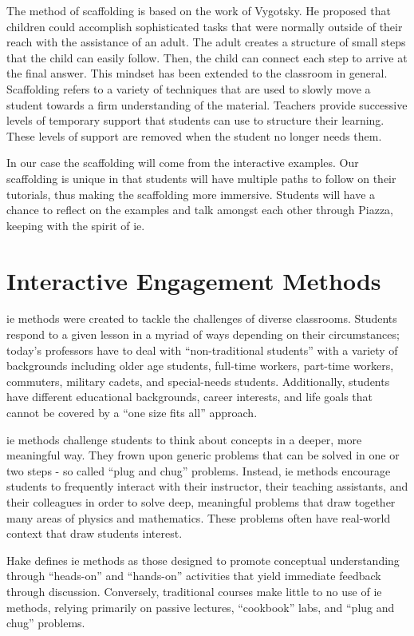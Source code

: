 The method of scaffolding is based on the work of Vygotsky. He proposed that children could accomplish sophisticated tasks that were normally outside of their reach with the assistance of an adult. The adult creates a structure of small steps that the child can easily follow. Then, the child can connect each step to arrive at the final answer. This mindset has been extended to the classroom in general. Scaffolding refers to a variety of techniques that are used to slowly move a student towards a firm understanding of the material. Teachers provide successive levels of temporary support that students can use to structure their learning. These levels of support are removed when the student no longer needs them.

In our case the scaffolding will come from the interactive examples. Our scaffolding is unique in that students will have multiple paths to follow on their tutorials, thus making the scaffolding more immersive. Students will have a chance to reflect on the examples and talk amongst each other through Piazza, keeping with the spirit of \gls{ie}.

\section{Interactive Engagement Methods}

\gls{ie} methods were created to tackle the challenges of diverse classrooms. Students respond to a given lesson in a myriad of ways depending on their circumstances; today's professors have to deal with ``non-traditional students'' with a variety of backgrounds including older age students, full-time workers, part-time workers, commuters, military cadets, and special-needs students. Additionally, students have different educational backgrounds, career interests, and life goals that cannot be covered by a ``one size fits all'' approach\cite{novak1999}.

\gls{ie} methods challenge students to think about concepts in a deeper, more meaningful way. They frown upon generic problems that can be solved in one or two steps - so called ``plug and chug'' problems. Instead, \gls{ie} methods encourage students to frequently interact with their instructor, their teaching assistants, and their colleagues in order to solve deep, meaningful problems that draw together many areas of physics and mathematics. These problems often have real-world context that draw students interest.

Hake defines \gls{ie} methods as those designed to promote conceptual understanding through ``heads-on'' and ``hands-on'' activities that yield immediate feedback through discussion. Conversely, traditional courses make little to no use of \gls{ie} methods, relying primarily on passive lectures, ``cookbook'' labs, and ``plug and chug'' problems.

